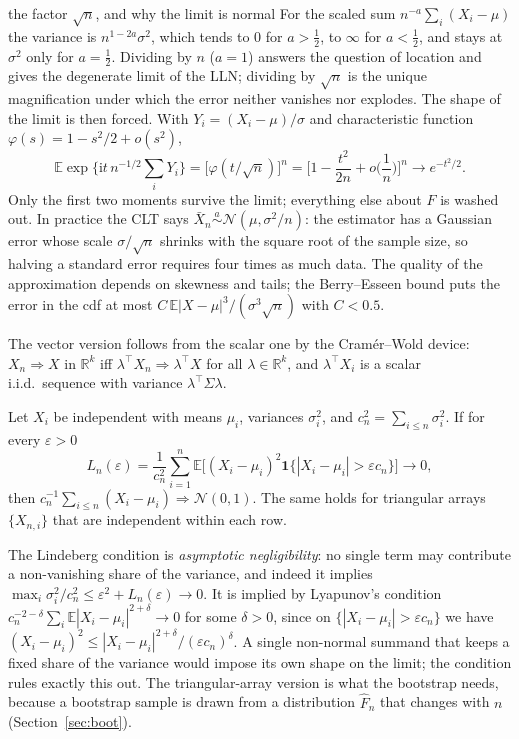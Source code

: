 \documentclass[11pt,a4paper]{article}
\newcommand{\E}{\mathbb{E}}
\newcommand{\R}{\mathbb{R}}
\newcommand{\N}{\mathcal{N}}
\newcommand{\cd}{\Rightarrow}
\newcommand{\iid}{i.i.d.}
\newcommand{\one}{\mathbf 1}
\newcommand{\Xbar}{\bar X_n}
\newcommand{\Fn}{\widehat F_n}
\begin{document}
\begin{whybox}{the factor $\sqrt n$, and why the limit is normal}
For the scaled sum $n^{-a}\sum_i(X_i-\mu)$ the variance is $n^{1-2a}\sigma^2$, which tends to $0$ for $a>\frac12$, to $\infty$ for $a<\frac12$, and stays at $\sigma^2$ only for $a=\frac12$. Dividing by $n$ ($a=1$) answers the question of location and gives the degenerate limit of the LLN; dividing by $\sqrt n$ is the unique magnification under which the error neither vanishes nor explodes. The shape of the limit is then forced. With $Y_i=(X_i-\mu)/\sigma$ and characteristic function $\varphi(s)=1-s^2/2+o(s^2)$,
\[
\E\exp\Big\{\mathrm it\,n^{-1/2}\textstyle\sum_iY_i\Big\}=\big[\varphi(t/\sqrt n)\big]^n=\Big[1-\frac{t^2}{2n}+o\Big(\frac1n\Big)\Big]^n\to e^{-t^2/2}.
\]
Only the first two moments survive the limit; everything else about $F$ is washed out. In practice the CLT says $\Xbar\overset{a}{\sim}\N(\mu,\sigma^2/n)$: the estimator has a Gaussian error whose scale $\sigma/\sqrt n$ shrinks with the square root of the sample size, so halving a standard error requires four times as much data. The quality of the approximation depends on skewness and tails; the Berry--Esseen bound puts the error in the cdf at most $C\,\E|X-\mu|^3/(\sigma^3\sqrt n)$ with $C<0.5$.
\end{whybox}

The vector version follows from the scalar one by the Cram\'er--Wold device: $X_n\cd X$ in $\R^k$ iff $\lambda^\top X_n\cd\lambda^\top X$ for all $\lambda\in\R^k$, and $\lambda^\top X_i$ is a scalar \iid\ sequence with variance $\lambda^\top\Sigma\lambda$.

\begin{theorem}\label{thm:lindeberg}
Let $X_i$ be independent with means $\mu_i$, variances $\sigma_i^2$, and $c_n^2=\sum_{i\le n}\sigma_i^2$. If for every $\varepsilon>0$
\begin{equation}\label{eq:lindeberg}
L_n(\varepsilon)=\frac{1}{c_n^2}\sum_{i=1}^n\E\big[(X_i-\mu_i)^2\one\{|X_i-\mu_i|>\varepsilon c_n\}\big]\to0,
\end{equation}
then $c_n^{-1}\sum_{i\le n}(X_i-\mu_i)\cd\N(0,1)$. The same holds for triangular arrays $\{X_{n,i}\}$ that are independent within each row.
\end{theorem}

The Lindeberg condition is \emph{asymptotic negligibility}: no single term may contribute a non-vanishing share of the variance, and indeed it implies $\max_i\sigma_i^2/c_n^2\le\varepsilon^2+L_n(\varepsilon)\to0$. It is implied by Lyapunov's condition $c_n^{-2-\delta}\sum_i\E|X_i-\mu_i|^{2+\delta}\to0$ for some $\delta>0$, since on $\{|X_i-\mu_i|>\varepsilon c_n\}$ we have $(X_i-\mu_i)^2\le|X_i-\mu_i|^{2+\delta}/(\varepsilon c_n)^\delta$. A single non-normal summand that keeps a fixed share of the variance would impose its own shape on the limit; the condition rules exactly this out. The triangular-array version is what the bootstrap needs, because a bootstrap sample is drawn from a distribution $\Fn$ that changes with $n$ (Section~\ref{sec:boot}).
\end{document}
